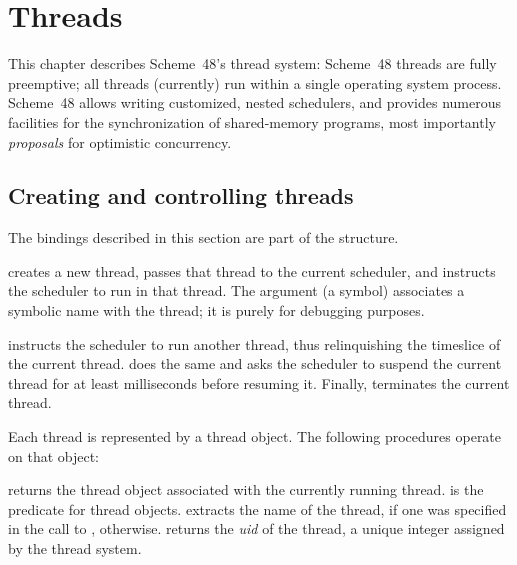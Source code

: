 

\chapter{Threads}


This chapter describes Scheme~48's thread system: Scheme~48 threads
are fully preemptive; all threads (currently) run within a single
operating system process.  Scheme~48 allows writing customized, nested
schedulers, and provides numerous facilities for the synchronization
of shared-memory programs, most importantly \textit{proposals} for
optimistic concurrency.

\section{Creating and controlling threads}

The bindings described in this section are part of the 
structure.
%
\begin{protos}
\end{protos}
%
 creates a new thread, passes that thread to the current
scheduler, and instructs the scheduler to run  in that
thread.  The  argument (a symbol) associates a symbolic
name with the thread; it is purely for debugging purposes.
%
\begin{protos}
\end{protos}
%
 instructs the scheduler to run another
thread, thus relinquishing the timeslice of the current thread.
 does the same and asks the scheduler to suspend the
current thread for at least  milliseconds
before resuming it.  Finally, 
terminates the current thread.

Each thread is represented by a thread object.  The following
procedures operate on that object:
%
\begin{protos}
\end{protos}
%
 returns the thread object associated with the
currently running thread.  
 is the predicate for thread objects.
 extracts the name of the thread, if one was
specified in the call to ,  otherwise.
 returns the \textit{uid} of the thread, a unique
integer assigned by the thread system.

